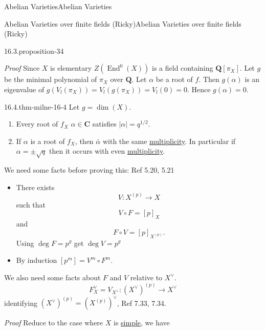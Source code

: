 \documentclass[10pt,]{book}
\makeatletter
\renewcommand*{\proofname}{Proof}
\renewenvironment{proof}[1][\proofname]{\par
  \pushQED{\qed}%
  \normalfont \topsep6\p@\@plus6\p@\relax
  \trivlist
  \item\relax
    {\itshape
    #1\@addpunct{.}}\hspace\labelsep\ignorespaces
}{%
  \popQED\endtrivlist\@endpefalse
}
\numberwithin{equation}{section}
\newcommand{\lb}{[}
\newcommand{\rb}{]}
\newcommand{\QQ}{\mathbf{Q}}
\newcommand{\CC}{\mathbf{C}}
\DeclareMathOperator{\End}{End}
\makeatother
\begin{document}
\begin{chapterptx}{Abelian Varieties}{}{Abelian Varieties}{}{}
\begin{sectionptx}{Abelian Varieties over finite fields (Ricky)}{}{Abelian Varieties over finite fields (Ricky)}{}{}
\begin{proposition}{16.3.}{}{proposition-34}
\end{proposition}
\begin{proof}\hypertarget{proof-61}{}
\hypertarget{p-364}{}%
Since \(X\) is elementary \(Z(\End^0(X))\) is  a field containing \(\QQ\lb \pi_X\rb\). Let \(g\) be the minimal polynomial of \(\pi_X\) over \(\QQ\). Let \(\alpha\) be a root of \(f\). Then \(g(\alpha)\) is an eigenvalue of \(g(V_l(\pi_X)) = V_l(g(\pi_X)) = V_l(0) = 0\). Hence \(g(\alpha) = 0\).%
\end{proof}
\begin{theorem}{16.4.}{}{thm-milne-16-4}%
\hypertarget{p-365}{}%
Let \(g= \dim (X)\).\leavevmode%
\begin{enumerate}
\item\hypertarget{li-60}{}Every root of \(f_X\) \(\alpha \in \CC\) satisfies \(|\alpha| = q^{1/2}\).%
\item\hypertarget{li-61}{}If \(\alpha\) is  a root of \(f_X\), then \(\bar \alpha\) with the same \hyperref[def-riem-order-vanish]{multiplicity}. In particular if \(\alpha = \pm \sqrt q\) then it occurs with even \hyperref[def-riem-order-vanish]{multiplicity}.%
\end{enumerate}
%
\end{theorem}
\hypertarget{p-366}{}%
We need some facts before proving this: Ref 5.20, 5.21\leavevmode%
\begin{itemize}[label=\textbullet]
\item{}There exists%
\begin{equation*}
V\colon X^{(p)} \to X
\end{equation*}
such that%
\begin{equation*}
V\circ F = [p]_X
\end{equation*}
and%
\begin{equation*}
F \circ V = [p]_{X^{(p)}}\text{.}
\end{equation*}
Using \(\deg F = p^g \)  get \(\deg V = p^g\)%
\item{}By induction \(\lb p^m\rb = V^m \circ F^m\).%
\end{itemize}
%
\par
\hypertarget{p-367}{}%
We also need some facts about \(F\) and \(V\) relative to \(X^\vee\).%
\begin{equation*}
F_X^\vee = V_{X^\vee} \colon (X^\vee)^{(p)} \to X^\vee
\end{equation*}
identifying \((X^\vee)^{(p)} = (X^{(p)})^\vee\), Ref 7.33, 7.34.%
\begin{proof}\hypertarget{proof-62}{}
\hypertarget{p-368}{}%
Reduce to the case where \(X\) is \hyperref[def-simple-av]{simple}, we have%

\end{proof}
\end{sectionptx}
\end{chapterptx}
\end{document}

